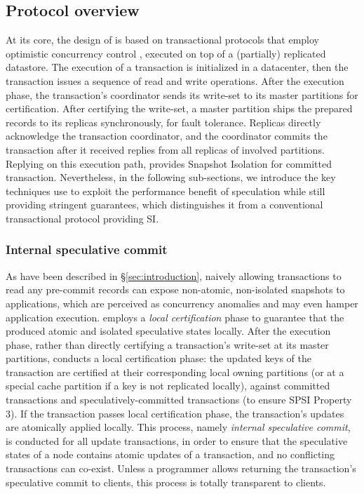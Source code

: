 \subsection{Protocol overview}
\label{sub:overview}
At its core, the design of \specula is based on transactional protocols that employ optimistic concurrency control \cite{clocksi, mdcc}, executed on top of a (partially) replicated datastore. The execution of a transaction is initialized in a datacenter, then the transaction issues a sequence of read and write operations. After the execution phase, the transaction's coordinator sends its write-set to its master partitions for certification. After certifying the write-set, a master partition ships the prepared records to its replicas synchronously, for fault tolerance. Replicas directly acknowledge the transaction coordinator, and the coordinator commits the transaction after it received replies from all replicas of involved partitions. Replying on this execution path, \specula provides Snapshot Isolation for committed transaction. Nevertheless, in the following sub-sections, we introduce the key techniques \specula use to exploit the performance benefit of speculation while still providing stringent guarantees, which distinguishes it from a conventional transactional protocol providing SI.

\subsubsection{Internal speculative commit}
\label{subsubsec:isc}
As have been described in \S \ref{sec:introduction}, naively allowing transactions to read any pre-commit records can expose non-atomic, non-isolated snapshots to applications, which are perceived as concurrency anomalies and may even hamper application execution. \specula employs a \textit{local certification} phase to guarantee that the produced atomic and isolated speculative states locally. After the execution phase, rather than directly certifying a transaction's write-set at its master partitions, \specula conducts a local certification phase: the updated keys of the transaction are certified at their corresponding local owning partitions (or at a special cache partition if a key is not replicated locally), against committed transactions and speculatively-committed transactions (to ensure SPSI Property 3). If the transaction passes local certification phase, the transaction's updates are atomically applied locally. This process, namely \textit{internal speculative commit}, is conducted for all update transactions, in order to ensure that the speculative states of a node contains atomic updates of a transaction, and no conflicting transactions can co-exist. Unless a programmer allows returning the transaction's speculative commit to clients, this process is totally transparent to clients.


